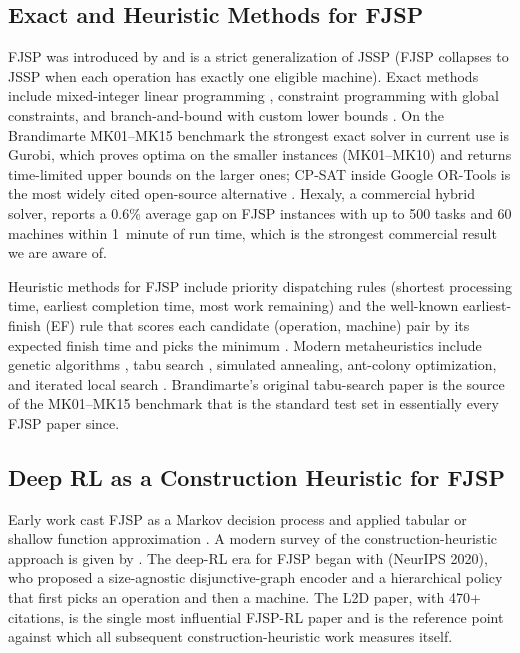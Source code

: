 \documentclass[10pt]{article}
\theoremstyle{definition}
\begin{document}
\subsection{Exact and Heuristic Methods for FJSP}
\label{sec:rw-foundations}

FJSP was introduced by \citet{Brucker1990} and is a strict
generalization of JSSP (FJSP collapses to JSSP when each operation
has exactly one eligible machine). Exact methods include
mixed-integer linear programming
\citep{Ozguven2010}, constraint programming with
global constraints, and branch-and-bound with custom lower bounds
\citep{Brucker1994}. On the Brandimarte MK01--MK15 benchmark the
strongest exact solver in current use is Gurobi, which proves
optima on the smaller instances (MK01--MK10) and returns
time-limited upper bounds on the larger ones; CP-SAT inside
Google OR-Tools is the most widely cited open-source alternative
\citep{Perron2022ORtools}. Hexaly, a commercial hybrid solver,
reports a 0.6\% average gap on FJSP instances with
up to 500 tasks and 60 machines within 1~minute of run time,
which is the strongest commercial result we are aware of.

Heuristic methods for FJSP include priority dispatching rules
(shortest processing time, earliest completion time, most work
remaining) and the well-known earliest-finish (EF) rule that
scores each candidate (operation, machine) pair by its expected
finish time and picks the minimum \citep{Blackstone1982,
Holthaus1997}. Modern metaheuristics include genetic algorithms
\citep{Stutzle2006ILS}, tabu search
\citep{Brandimarte1993}, simulated annealing,
ant-colony optimization, and iterated local search
\citep{Stutzle2006ILS}.
Brandimarte's original tabu-search paper \citep{Brandimarte1993}
is the source of the MK01--MK15 benchmark that is the standard
test set in essentially every FJSP paper since.

\subsection{Deep RL as a Construction Heuristic for FJSP}
\label{sec:rw-construction}

Early work cast FJSP as a Markov decision process and
applied tabular or shallow function approximation
\citep{Aydin2000}. A modern survey of the
construction-heuristic approach is given by
\citet{Gomes2024Survey}. The deep-RL era for FJSP began
with \citet{Zhang2020L2D} (NeurIPS 2020), who proposed
a size-agnostic disjunctive-graph encoder and a
hierarchical policy that first picks an operation and
then a machine. The L2D paper,
with 470+ citations, is the single most influential FJSP-RL paper
and is the reference point against which all subsequent
construction-heuristic work measures itself.
\end{document}
